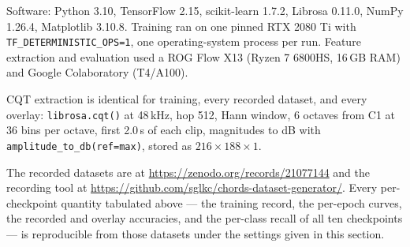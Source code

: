 \documentclass[pdflatex,sn-mathphys-num]{sn-jnl}
\begin{document}
Software: Python 3.10, TensorFlow 2.15, scikit-learn 1.7.2, Librosa 0.11.0, NumPy 1.26.4, Matplotlib 3.10.8. Training ran on one pinned RTX 2080 Ti with \texttt{TF\_DETERMINISTIC\_OPS=1}, one operating-system process per run. Feature extraction and evaluation used a ROG Flow X13 (Ryzen 7 6800HS, 16\,GB RAM) and Google Colaboratory (T4/A100).

CQT extraction is identical for training, every recorded dataset, and every overlay: \texttt{librosa.cqt()} at 48\,kHz, hop 512, Hann window, 6 octaves from C1 at 36 bins per octave, first 2.0\,s of each clip, magnitudes to dB with \texttt{amplitude\_to\_db(ref=max)}, stored as $216\times188\times1$.

The recorded datasets are at \url{https://zenodo.org/records/21077144} and the recording tool at \url{https://github.com/sglkc/chords-dataset-generator/}. Every per-checkpoint quantity tabulated above --- the training record, the per-epoch curves, the recorded and overlay accuracies, and the per-class recall of all ten checkpoints --- is reproducible from those datasets under the settings given in this section.


\end{document}
